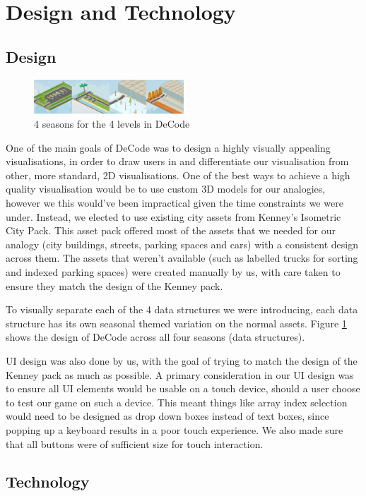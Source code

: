 \documentclass[10pt]{article}
\begin{document}
\section{Design and Technology}
\subsection{Design}
\begin{figure}
  \centering
  \includegraphics[width=0.5\textwidth]{images/seasons.png}
\caption{4 seasons for the 4 levels in DeCode}
\label{fig:seasons}
\end{figure}
One of the main goals of DeCode was to design a highly visually appealing visualisations, in order to draw users in and differentiate our visualisation from other, more standard, 2D visualisations. One of the best ways to achieve a high quality visualisation would be to use custom 3D models for our analogies, however we this would've been impractical given the time constraints we were under. Instead, we elected to use existing city assets from Kenney's Isometric City Pack\cite{KenneyAssets}. This asset pack offered most of the assets that we needed for our analogy (city buildings, streets, parking spaces and cars) with a consistent design across them. The assets that weren't available (such as labelled trucks for sorting and indexed parking spaces) were created manually by us, with care taken to ensure they match the design of the Kenney pack.\par
To visually separate each of the 4 data structures we were introducing, each data structure has its own seasonal themed variation on the normal assets. Figure \ref{fig:seasons} shows the design of DeCode across all four seasons (data structures).\par
UI design was also done by us, with the goal of trying to match the design of the Kenney pack as much as possible. A primary consideration in our UI design was to ensure all UI elements would be usable on a touch device, should a user choose to test our game on such a device. This meant things like array index selection would need to be designed as drop down boxes instead of text boxes, since popping up a keyboard results in a poor touch experience. We also made sure that all buttons were of sufficient size for touch interaction.
\subsection{Technology}
\end{document}
